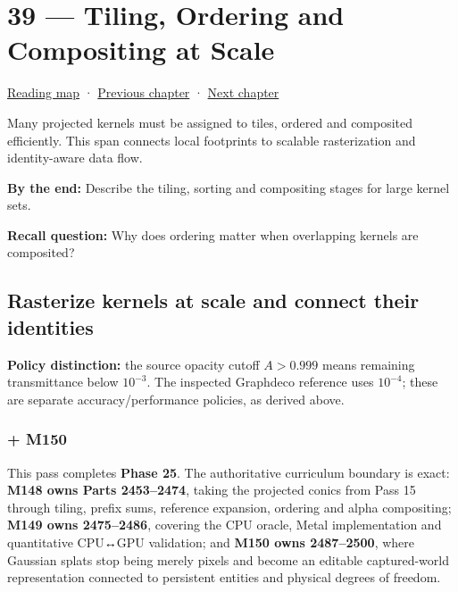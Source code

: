 \hypertarget{04-visual-computing-ii-ch039}{}
\chapter{39 --- Tiling, Ordering and Compositing at Scale}\label{04-visual-computing-ii-ch039-tiling-ordering-and-compositing-at-scale}

\hyperref[volume-reading-map]{Reading map} · \hyperref[04-visual-computing-ii-ch038-projecting-ellipsoids-into-screen-space-conics]{Previous chapter} · \hyperref[04-visual-computing-ii-ch040-lighting-reconstruction-and-surface-motion]{Next chapter}

Many projected kernels must be assigned to tiles, ordered and composited efficiently. This span connects local footprints to scalable rasterization and identity-aware data flow.

\textbf{By the end:} Describe the tiling, sorting and compositing stages for large kernel sets.

\textbf{Recall question:} Why does ordering matter when overlapping kernels are composited?

\section{Rasterize kernels at scale and connect their identities}\label{04-visual-computing-ii-ch039-rasterize-kernels-at-scale-and-connect-their-identities}

\textbf{Policy distinction:} the source opacity cutoff \(A>0.999\) means remaining transmittance below \(10^{-3}\). The inspected Graphdeco reference uses \(10^{-4}\); these are separate accuracy/performance policies, as derived above.

\subsection{+ M150}\label{04-visual-computing-ii-ch039-m150}

This pass completes \textbf{Phase 25}. The authoritative curriculum boundary is exact: \textbf{M148 owns Parts 2453--2474}, taking the projected conics from Pass 15 through tiling, prefix sums, reference expansion, ordering and alpha compositing; \textbf{M149 owns 2475--2486}, covering the CPU oracle, Metal implementation and quantitative CPU↔GPU validation; and \textbf{M150 owns 2487--2500}, where Gaussian splats stop being merely pixels and become an editable captured-world representation connected to persistent entities and physical degrees of freedom.

